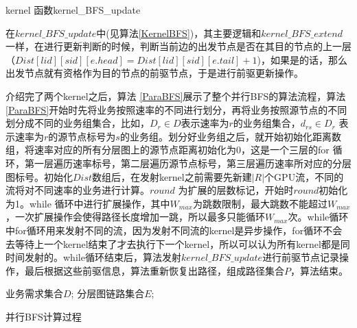 \begin{algorithm}[t]
\begin{algorithmic}[1]
\EndIf
{}
\EndIf
\EndFunction
\end{algorithmic}
\caption{kernel 函数kernel\_BFS\_update}
\label{KernelBFS}
\end{algorithm}

在$kernel\_BFS\_update$中(见算法\ref{KernelBFS})，其主要逻辑和$kernel\_BFS\_extend$一样，在进行更新判断的时候，判断当前边的出发节点是否在其目的节点的上一层（$Dist[lid][sid][e.head]= Dist[lid][sid][e.tail]+1$)，如果是的话，那么出发节点就有资格作为目的节点的前驱节点，于是进行前驱更新操作。

介绍完了两个kernel之后，算法 \ref{ParaBFS}展示了整个并行BFS的算法流程，算法 \ref{ParaBFS}开始时先将业务按照速率的不同进行划分，再将业务按照源节点的不同划分成不同的业务组集合，比如，$D_r \in D$表示速率为$r$的业务组集合，$d_{rs} \in D_r$ 表示速率为$r$的源节点标号为$s$的业务组。划分好业务组之后，就开始初始化距离数组，将速率对应的所有分层图上的源节点距离初始化为0，这是一个三层的for 循环，第一层遍历速率标号，第二层遍历源节点标号，第三层遍历速率所对应的分层图标号。初始化$Dist$数组后，在发射kernel之前需要先新建$|R|$个GPU流，不同的流将对不同速率的业务进行计算。$round$ 为扩展的层数标记，开始时$round$初始化为1。while 循环中进行扩展操作，其中$W_{max}$为跳数限制，最大跳数不能超过$W_{max}$，一次扩展操作会使得路径长度增加一跳，所以最多只能循环$W_{max}$次。while循环中for循环用来发射不同的流，因为发射不同流的kernel是异步操作，for循环不会去等待上一个kernel结束了才去执行下一个kernel，所以可以认为所有kernel都是同时间发射的。while循环结束后，算法发射$kernel\_BFS\_update$进行前驱节点记录操作，最后根据这些前驱信息，算法重新恢复出路径，组成路径集合$P$，算法结束。
\begin{algorithm}[t]
\begin{algorithmic}[1]
\Require
业务需求集合$D$;
分层图链路集合$E$;
\Else
{}
\EndIf
{}
\EndFor
\EndFor
\EndFor
\EndFor
{}
\EndFor
{}
\EndWhile
{}
\EndFor
{}
\end{algorithmic}
\caption{{并行BFS计算过程}}
\label{ParaBFS}
\end{algorithm}


